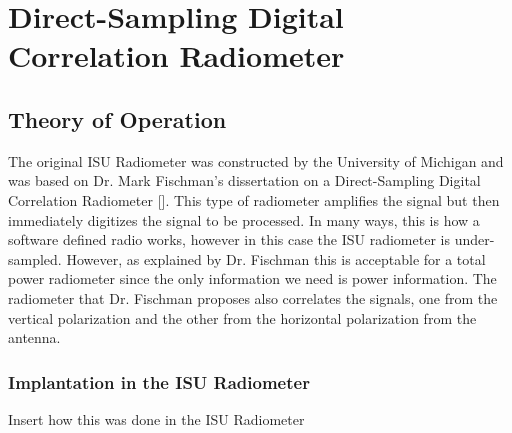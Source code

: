 \chapter{Direct-Sampling Digital Correlation Radiometer}

\section*{Theory of Operation}

The original ISU Radiometer was constructed by the University of Michigan and was based on Dr. Mark Fischman's dissertation on a Direct-Sampling Digital Correlation Radiometer [\cite{Fischman2001}].  This type of radiometer amplifies the signal but then immediately digitizes the signal to be processed.  In many ways, this is how a software defined radio works, however in this case the ISU radiometer is under-sampled.  However, as explained by Dr. Fischman this is acceptable for a total power radiometer since the only information we need is power information.  The radiometer that Dr. Fischman proposes also correlates the signals, one from the vertical polarization and the other from the horizontal polarization from the antenna.  

\subsection{Implantation in the ISU Radiometer}
Insert how this was done in the ISU Radiometer
